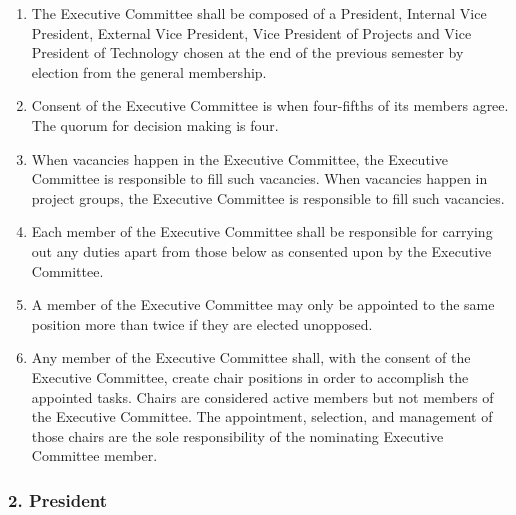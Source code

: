 \documentclass[
]{article}
\providecommand{\tightlist}{%
  \setlength{\itemsep}{0pt}\setlength{\parskip}{0pt}}
\begin{document}
\begin{enumerate}
\def\labelenumi{\arabic{enumi}.}
\tightlist
\item
  The Executive Committee shall be composed of a President, Internal
  Vice President, External Vice President, Vice President of Projects
  and Vice President of Technology chosen at the end of the previous
  semester by election from the general membership.
\item
  Consent of the Executive Committee is when four-fifths of its members
  agree. The quorum for decision making is four.
\item
  When vacancies happen in the Executive Committee, the Executive
  Committee is responsible to fill such vacancies. When vacancies happen
  in project groups, the Executive Committee is responsible to fill such
  vacancies.
\item
  Each member of the Executive Committee shall be responsible for
  carrying out any duties apart from those below as consented upon by
  the Executive Committee.
\item
  A member of the Executive Committee may only be appointed to the same
  position more than twice if they are elected unopposed.
\item
  Any member of the Executive Committee shall, with the consent of the
  Executive Committee, create chair positions in order to accomplish the
  appointed tasks. Chairs are considered active members but not members
  of the Executive Committee. The appointment, selection, and management
  of those chairs are the sole responsibility of the nominating
  Executive Committee member.
\end{enumerate}

\hypertarget{president}{%
\subsubsection{2. President}\label{president}}
\end{document}
